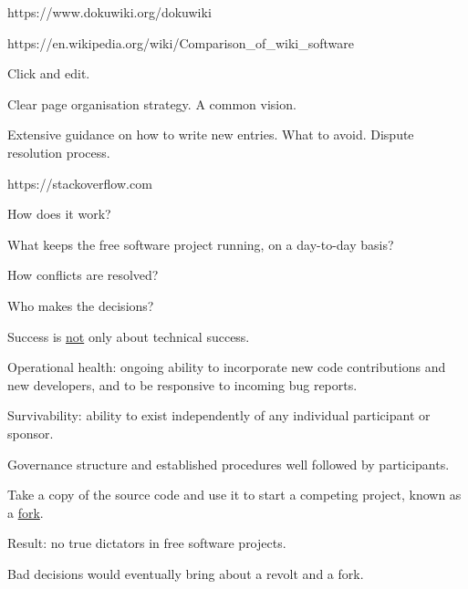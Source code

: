 \documentclass[landscape,30pt]{foils}
\begin{document}
https://www.dokuwiki.org/dokuwiki

https://en.wikipedia.org/wiki/Comparison\_of\_wiki\_software

Click and edit.

Clear page organisation strategy.  A common vision.

Extensive guidance on how to write new entries.  What to avoid.  Dispute resolution process.


https://stackoverflow.com






How does it work?

What keeps the free software project running, on a day-to-day basis?

How conflicts are resolved?

Who makes the decisions?

Success is \underline{not} only about technical success.

Operational health: ongoing ability to incorporate new code contributions and new developers, and to be responsive to incoming bug reports.

Survivability: ability to exist independently of any individual participant or sponsor.

Governance structure and established procedures well followed by participants.



Take a copy of the source code and use it to start a competing project, known as a \underline{fork}.

Result: no true dictators in free software projects.

Bad decisions would eventually bring about a revolt and a fork.

\end{document}

